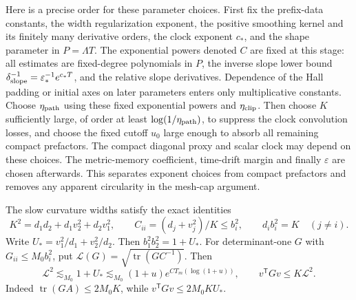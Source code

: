 \documentclass[11pt]{article}
\numberwithin{equation}{section}
\begin{document}
Here is a precise order for these parameter choices. First fix the
prefix-data constants, the width regularization exponent, the positive
smoothing kernel and its finitely many derivative orders, the clock
exponent $c_*$, and the shape parameter in $P=\Lambda T$. The
exponential powers denoted $C$ are fixed at this stage: all estimates
are fixed-degree polynomials in $P$, the inverse slope lower bound
$\delta_{\rm slope}^{-1}=\varepsilon_*^{-1}e^{c_*T}$, and the relative
slope derivatives. Dependence of the Hall padding or initial axes on
later parameters enters only multiplicative constants. Choose
$\eta_{\rm path}$ using these fixed exponential powers and
$\eta_{\rm clip}$. Then choose $K$ sufficiently large, of order at
least $\log(1/\eta_{\rm path})$, to suppress the clock convolution
losses, and choose the fixed cutoff $u_0$ large enough to absorb
all remaining compact prefactors. The compact diagonal proxy and scalar
clock may depend on these choices. The metric-memory coefficient,
time-drift margin and finally $\varepsilon$ are chosen afterwards.
This separates exponent choices from compact prefactors and removes
any apparent circularity in the mesh-cap argument.

The slow curvature widths satisfy the exact identities
\begin{equation}\label{pair:eq:canonical-width-identities}
 K^2=d_1d_2+d_1v_2^2+d_2v_1^2,\qquad
 C_{ii}=(d_j+v_j^2)/K\le b_i^2,\qquad d_ib_i^2=K\quad(j\ne i).
\end{equation}
Write $U_*=v_1^2/d_1+v_2^2/d_2$. Then $b_1^2b_2^2=1+U_*$.
For determinant-one $G$ with $G_{ii}\le M_0b_i^2$, put
$\mathcal L(G)=\sqrt{\operatorname{tr}(GC^{-1})}$. Then
\begin{equation}\label{pair:eq:general-lag-size}
 \mathcal L^2\lesssim_{M_0}1+U_*
 \lesssim_{M_0}(1+u)e^{CT_m(\log(1+u))},
 \qquad v^{\mathsf T}Gv\le K\mathcal L^2.
\end{equation}
Indeed $\operatorname{tr}(GA)\le2M_0K$, while
$v^{\mathsf T}Gv\le2M_0K U_*$.
\end{document}
